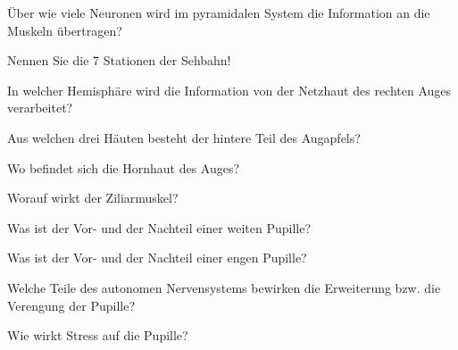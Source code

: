 \documentclass[10pt, a4paper]{exam}
\begin{document}
\begin{questions}
\begin{solution}
  \end{solution}

  \question Über wie viele Neuronen wird im pyramidalen System die Information an die Muskeln übertragen?
  \begin{solution}

  \end{solution}

  \question Nennen Sie die 7 Stationen der Sehbahn!
  \begin{solution}

  \end{solution}

  \question In welcher Hemisphäre wird die Information von der Netzhaut des rechten Auges verarbeitet?
  \begin{solution}

  \end{solution}

  \question Aus welchen drei Häuten besteht der hintere Teil des Augapfels?
  \begin{solution}

  \end{solution}

  \question Wo befindet sich die Hornhaut des Auges?
  \begin{solution}

  \end{solution}

  \question Worauf wirkt der Ziliarmuskel?
  \begin{solution}

  \end{solution}

  \question Was ist der Vor- und der Nachteil einer weiten Pupille?
  \begin{solution}

  \end{solution}

  \question Was ist der Vor- und der Nachteil einer engen Pupille?
  \begin{solution}

  \end{solution}

  \question Welche Teile des autonomen Nervensystems bewirken die Erweiterung bzw. die Verengung der Pupille?
  \begin{solution}

  \end{solution}

  \question Wie wirkt Stress auf die Pupille?
  \begin{solution}


\end{solution}
\end{questions}
\end{document}
